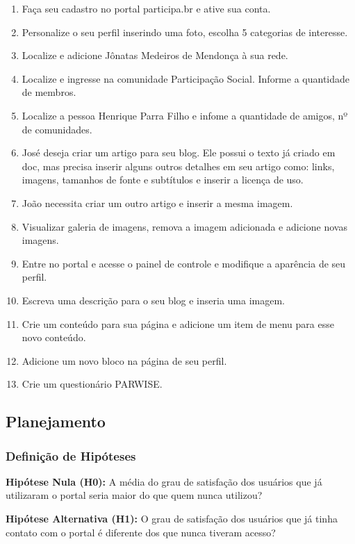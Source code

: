 \begin{enumerate}
	\item Faça seu cadastro no portal participa.br e ative sua conta.
	\item Personalize o seu perfil inserindo uma foto, escolha 5 categorias de interesse.
	\item Localize e adicione Jônatas Medeiros de Mendonça à sua rede.
	\item Localize e ingresse na comunidade Participação Social. Informe a quantidade de membros.
	\item Localize a pessoa Henrique Parra Filho e infome a quantidade de amigos, nº de comunidades.
	\item José deseja criar um artigo para seu blog. Ele possui o texto já criado em doc, mas precisa inserir alguns outros detalhes em seu artigo como: links, imagens, tamanhos de fonte e subtítulos e inserir a licença de uso.
	\item João necessita criar um outro artigo e inserir a mesma imagem.
	\item Visualizar galeria de imagens, remova a imagem adicionada e adicione novas imagens.
	\item Entre no portal e acesse o painel de controle e modifique a aparência de seu perfil.
	\item Escreva uma descrição para o seu blog e inseria uma imagem.
	\item Crie um conteúdo para sua página e adicione um item de menu para esse novo conteúdo.
	\item Adicione um novo bloco na página de seu perfil.
	\item Crie um questionário PARWISE.
\end{enumerate}

\subsection{Planejamento}

\subsubsection{Definição de Hipóteses}

\textbf{Hipótese Nula (H0):} A média do grau de satisfação dos usuários que já utilizaram o portal seria maior do que quem nunca utilizou?

\textbf{Hipótese Alternativa (H1):} O grau de satisfação dos usuários que já tinha contato com o portal é diferente dos que nunca tiveram acesso?

